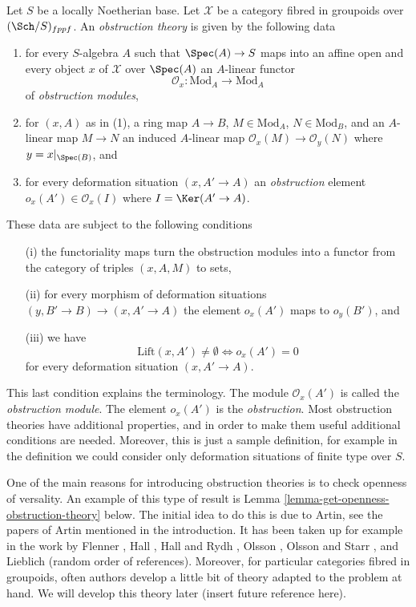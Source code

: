 \begin{definition}
\label{definition-obstruction-theory}
Let $S$ be a locally Noetherian base. Let $\mathcal{X}$ be a category fibred
in groupoids over $(\Sch/S)_{fppf}$. An {\it obstruction theory} is 
given by the following data
\begin{enumerate}
\item for every $S$-algebra $A$ such that $\Spec(A) \to S$
maps into an affine open and every object $x$ of $\mathcal{X}$ over
$\Spec(A)$ an $A$-linear functor
$$
\mathcal{O}_x : \text{Mod}_A \to \text{Mod}_A
$$
of {\it obstruction modules},
\item for $(x, A)$ as in (1), a ring map $A \to B$,
$M \in \text{Mod}_A$, $N \in \text{Mod}_B$, and an $A$-linear
map $M \to N$ an induced $A$-linear map $\mathcal{O}_x(M) \to \mathcal{O}_y(N)$
where $y = x|_{\Spec(B)}$, and
\item for every deformation situation $(x, A' \to A)$ an
{\it obstruction} element
$o_x(A') \in \mathcal{O}_x(I)$ where $I = \Ker(A' \to A)$.
\end{enumerate}
These data are subject to the following conditions
\begin{enumerate}
\item[(i)] the functoriality maps turn the obstruction modules into a functor
from the category of triples $(x, A, M)$ to sets,
\item[(ii)] for every morphism of deformation situations
$(y, B' \to B) \to (x, A' \to A)$ the element $o_x(A')$ maps
to $o_y(B')$, and
\item[(iii)] we have
$$
\text{Lift}(x, A') \not = \emptyset
\Leftrightarrow
o_x(A') = 0
$$
for every deformation situation $(x, A' \to A)$.
\end{enumerate}
\end{definition}

\noindent
This last condition explains the terminology. The module $\mathcal{O}_x(A')$
is called the {\it obstruction module}. The element $o_x(A')$ is the
{\it obstruction}.
Most obstruction theories have additional properties, and in order to
make them useful additional conditions are needed.
Moreover, this is just a sample definition, for example in the definition
we could consider only deformation situations of finite type over $S$.

\medskip\noindent
One of the main reasons for introducing obstruction theories is to check
openness of versality. An example of this type of result is
Lemma \ref{lemma-get-openness-obstruction-theory} below.
The initial idea to do this is due to Artin, see
the papers of Artin mentioned in the introduction. It has been taken up
for example in the work by Flenner \cite{Flenner},
Hall \cite{Hall-coherent},
Hall and Rydh \cite{rydh_axioms},
Olsson \cite{olsson_deformation},
Olsson and Starr \cite{olsson-starr}, and
Lieblich \cite{lieblich-complexes} (random order of references).
Moreover, for particular categories fibred in groupoids, often
authors develop a little bit of theory adapted to the problem at hand.
We will develop this theory later (insert future reference here).

